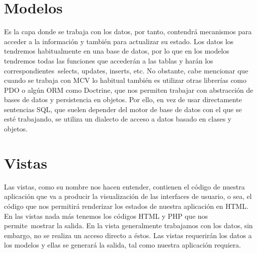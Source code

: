 \section{Modelos}

Es la capa donde se trabaja con los datos, por tanto, contendrá mecanismos para acceder a la información y también para actualizar su estado. Los datos los tendremos habitualmente en una base de datos, por lo que en los modelos tendremos todas las funciones que accederán a las tablas y harán los correspondientes selects, updates, inserts, etc.
No obstante, cabe mencionar que cuando se trabaja con MCV lo habitual también es utilizar otras librerías como PDO o algún ORM como Doctrine, que nos permiten trabajar con abstracción de bases de datos y persistencia en objetos. Por ello, en vez de usar directamente sentencias SQL, que suelen depender del motor de base de datos con el que se esté trabajando, se utiliza un dialecto de acceso a datos basado en clases y objetos. \cite{marco3}


\section{Vistas}
Las vistas, como su nombre nos hacen entender, contienen el código de nuestra aplicación que va a producir la visualización de las interfaces de usuario, o sea, el código que nos permitirá renderizar los estados de nuestra aplicación en HTML. En las vistas nada más tenemos los códigos HTML y PHP que nos permite mostrar la salida.
En la vista generalmente trabajamos con los datos, sin embargo, no se realiza un acceso directo a éstos. Las vistas requerirán los datos a los modelos y ellas se generará la salida, tal como nuestra aplicación requiera. \cite{marco3}

